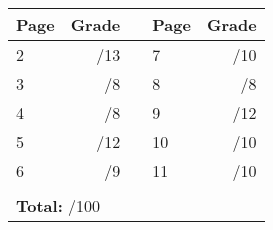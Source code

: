 \documentclass[12pt]{article}
\begin{document}
\begin{table}[hbt]
\begin{center}
\begin{tabular}{|l|r|c|l|r|} \hline
Page&Grade & \hspace{24pt} &Page & Grade\\
\hline \hline
 2 & \enspace\enspace\enspace\enspace\enspace\enspace/13 & &  7 & \enspace\enspace\enspace\enspace\enspace\enspace/10 \\
\hline
 3 & \enspace\enspace\enspace\enspace\enspace\enspace/8 & &  8 & \enspace\enspace\enspace\enspace\enspace\enspace/8\\
\hline
 4 & \enspace\enspace\enspace\enspace\enspace\enspace/8 & & 9 & \enspace\enspace\enspace\enspace\enspace\enspace/12\\
\hline
 5 & \enspace\enspace\enspace\enspace\enspace\enspace/12 & &  10 & \enspace\enspace\enspace\enspace\enspace\enspace/10\\
\hline
 6 & \enspace\enspace\enspace\enspace\enspace\enspace/9 & &  11 & \enspace\enspace\enspace\enspace\enspace\enspace/10\\
\hline
\multicolumn{5}{|c|}{}\\
\multicolumn{5}{|l|}{{\bf Total:}\hspace{168 pt} /100}\\
\hline
\end{tabular}

\medskip


\end{center}
\end{table}
\newpage
\end{document}

